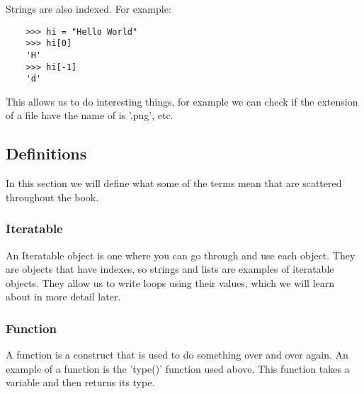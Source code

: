 Strings are also indexed. For example:

\begin{lstlisting}
    >>> hi = "Hello World"
    >>> hi[0]
    'H'
    >>> hi[-1]
    'd'
\end{lstlisting}

This allows us to do interesting things, for example we can check if the
extension of a file have the name of is '.png', etc.

\subsection{Definitions}

In this section we will define what some of the terms mean that are scattered
throughout the book.

\subsubsection{Iteratable}

An Iteratable object is one where you can go through and use each object. They
are objects that have indexes, so strings and lists are examples of iteratable
objects. They allow us to write loops using their values, which we will learn
about in more detail later.

\subsubsection{Function}

A function is a construct that is used to do something over and over again.
An example of a function is the 'type()' function used above. This function
takes a variable and then returns its type.
